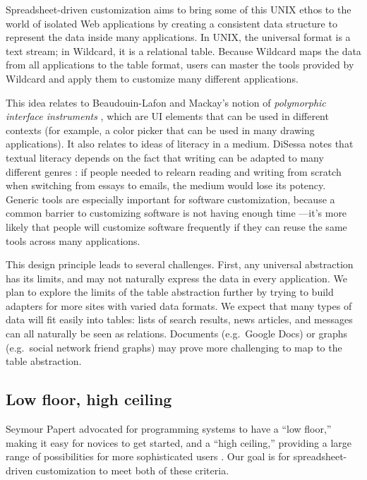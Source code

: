 \documentclass[english,submission]{programming}
\begin{document}
Spreadsheet-driven customization aims to bring some of this UNIX ethos
to the world of isolated Web applications by creating a consistent data
structure to represent the data inside many applications. In UNIX, the
universal format is a text stream; in Wildcard, it is a relational
table. Because Wildcard maps the data from all applications to the table
format, users can master the tools provided by Wildcard and apply them
to customize many different applications.

This idea relates to Beaudouin-Lafon and Mackay's notion of
\emph{polymorphic interface instruments} \autocite{beaudouin-lafon2000},
which are UI elements that can be used in different contexts (for
example, a color picker that can be used in many drawing applications).
It also relates to ideas of literacy in a medium. DiSessa notes that
textual literacy depends on the fact that writing can be adapted to many
different genres \autocite{disessa2000}: if people needed to relearn
reading and writing from scratch when switching from essays to emails,
the medium would lose its potency. Generic tools are especially
important for software customization, because a common barrier to
customizing software is not having enough time
\autocite{mackay1991}---it's more likely that people will customize
software frequently if they can reuse the same tools across many
applications.

This design principle leads to several challenges. First, any universal
abstraction has its limits, and may not naturally express the data in
every application. We plan to explore the limits of the table
abstraction further by trying to build adapters for more sites with
varied data formats. We expect that many types of data will fit easily
into tables: lists of search results, news articles, and messages can
all naturally be seen as relations. Documents (e.g.~Google Docs) or
graphs (e.g.~social network friend graphs) may prove more challenging to
map to the table abstraction.

\hypertarget{low-floor-high-ceiling}{%
\subsection{Low floor, high ceiling}\label{low-floor-high-ceiling}}

Seymour Papert advocated for programming systems to have a ``low
floor,'' making it easy for novices to get started, and a ``high
ceiling,'' providing a large range of possibilities for more
sophisticated users \autocite{resnick2016}. Our goal is for
spreadsheet-driven customization to meet both of these criteria.
\end{document}
